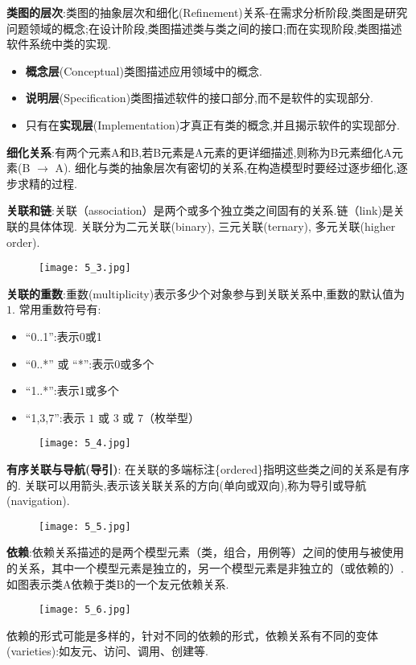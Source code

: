 \documentclass[../main.tex]{subfiles}
\begin{document}
\textbf{类图的层次}:类图的抽象层次和细化(Refinement)关系-在需求分析阶段,类图是研究问题领域的概念;在设计阶段,类图描述类与类之间的接口;而在实现阶段,类图描述软件系统中类的实现.
\begin{itemize}
  \item \textbf{概念层}(Conceptual)类图描述应用领域中的概念.
  \item \textbf{说明层}(Specification)类图描述软件的接口部分,而不是软件的实现部分.
  \item 只有在\textbf{实现层}(Implementation)才真正有类的概念,并且揭示软件的实现部分.
\end{itemize}
\textbf{细化关系}:有两个元素A和B,若B元素是A元素的更详细描述,则称为B元素细化A元素(B
$ \rightarrow $ A).
细化与类的抽象层次有密切的关系,在构造模型时要经过逐步细化,逐步求精的过程.

\textbf{关联和链}:关联（association）是两个或多个独立类之间固有的关系.链（link)是关联的具体体现.
关联分为二元关联(binary), 三元关联(ternary), 多元关联(higher order).
\begin{figure}[H]
  \begin{center}
    \texttt{[image: 5\_3.jpg]}
  \end{center}
\end{figure}
\textbf{关联的重数}:重数(multiplicity)表示多少个对象参与到关联关系中,重数的默认值为 $ 1 $.
常用重数符号有:
\begin{itemize}
  \item  ``0..1'':表示0或1
  \item  ``0..*'' 或 ``*'':表示0或多个
  \item  ``1..*'':表示1或多个
  \item  ``1,3,7'':表示 $ 1 $ 或 $ 3 $ 或 $ 7 $（枚举型）
\end{itemize}
\begin{figure}[H]
  \begin{center}
    \texttt{[image: 5\_4.jpg]}
  \end{center}
\end{figure}
\noindent \textbf{有序关联与导航(导引)}:
在关联的多端标注\{ordered\}指明这些类之间的关系是有序的.
关联可以用箭头,表示该关联关系的方向(单向或双向),称为导引或导航(navigation).
\begin{figure}[H]
  \begin{center}
    \texttt{[image: 5\_5.jpg]}
  \end{center}
\end{figure}
\noindent \textbf{依赖}:依赖关系描述的是两个模型元素（类，组合，用例等）之间的使用与被使用的关系，其中一个模型元素是独立的，另一个模型元素是非独立的（或依赖的）.如图表示类A依赖于类B的一个友元依赖关系.
\begin{figure}[H]
  \begin{center}
    \texttt{[image: 5\_6.jpg]}
  \end{center}
\end{figure}
\noindent 依赖的形式可能是多样的，针对不同的依赖的形式，依赖关系有不同的变体(varieties):如友元、访问、调用、创建等.
\end{document}
